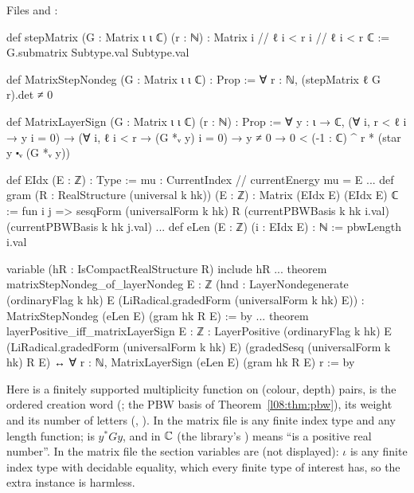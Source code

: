 {\raggedright\noindent Files  and
:\par}
\begin{leancode}
def stepMatrix (G : Matrix ι ι ℂ) (r : ℕ) : Matrix {i // ℓ i < r} {i // ℓ i < r} ℂ :=
  G.submatrix Subtype.val Subtype.val

def MatrixStepNondeg (G : Matrix ι ι ℂ) : Prop :=
  ∀ r : ℕ, (stepMatrix ℓ G r).det ≠ 0

def MatrixLayerSign (G : Matrix ι ι ℂ) (r : ℕ) : Prop :=
  ∀ y : ι → ℂ, (∀ i, r < ℓ i → y i = 0) → (∀ i, ℓ i < r → (G *ᵥ y) i = 0) → y ≠ 0 →
    0 < (-1 : ℂ) ^ r * (star y ⬝ᵥ (G *ᵥ y))

def EIdx (E : ℤ) : Type := {mu : CurrentIndex // currentEnergy mu = E}
...
def gram (R : RealStructure (universal k hk)) (E : ℤ) : Matrix (EIdx E) (EIdx E) ℂ :=
  fun i j => sesqForm (universalForm k hk) R (currentPBWBasis k hk i.val)
    (currentPBWBasis k hk j.val)
...
def eLen (E : ℤ) (i : EIdx E) : ℕ := pbwLength i.val

variable (hR : IsCompactRealStructure R)
include hR
...
theorem matrixStepNondeg_of_layerNondeg {E : ℤ}
    (hnd : LayerNondegenerate (ordinaryFlag k hk) E (LiRadical.gradedForm (universalForm k hk) E)) :
    MatrixStepNondeg (eLen E) (gram hk R E) := by
...
theorem layerPositive_iff_matrixLayerSign {E : ℤ} :
    LayerPositive (ordinaryFlag k hk) E (LiRadical.gradedForm (universalForm k hk) E)
        (gradedSesq (universalForm k hk) R E) ↔
      ∀ r : ℕ, MatrixLayerSign (eLen E) (gram hk R E) r := by
\end{leancode}
\noindent Here  is a finitely supported multiplicity function on (colour, depth) pairs,
 is the ordered creation word 
(; the PBW basis of Theorem~\ref{l08:thm:pbw}),  its weight and
 its number of letters (,
). In the matrix file  is any finite index type and 
any length function;  is $y^*Gy$, and  in ${\mathbb{C}}$ (the library's
) means ``is a positive real number''. In the matrix file the section variables are
 (not displayed): $\iota$ is any finite index type with
decidable equality, which every finite type of interest has, so the extra instance is harmless.

